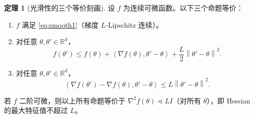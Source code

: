\documentclass[12pt,a4paper]{ctexart}
\theoremstyle{definition}
\newtheorem{theorem}{定理}[section]
\theoremstyle{plain}
\newcommand{\R}{\mathbb{R}}
\newcommand{\grad}{\nabla}
\newcommand{\norm}[1]{\left\lVert #1 \right\rVert}
\newcommand{\ip}[2]{\left\langle #1,#2 \right\rangle}
\begin{document}
\begin{theorem}[光滑性的三个等价刻画]\label{thm:smooth-equiv}
  设 $f$ 为连续可微函数。以下三个命题等价：
  \begin{enumerate}[label=(\roman*)]
    \item $f$ 满足 \eqref{eq:smooth1}（梯度 $L$-Lipschitz 连续）。
    \item 对任意 $\theta, \theta' \in \R^d$，
      \begin{equation}\label{eq:smooth2}
        f(\theta') \le f(\theta) + \ip{\grad f(\theta)}{\theta' - \theta} + \frac{L}{2}\norm{\theta' - \theta}^2.
      \end{equation}
    \item 对任意 $\theta, \theta' \in \R^d$，
      \begin{equation}\label{eq:smooth3}
        \ip{\grad f(\theta') - \grad f(\theta)}{\theta' - \theta} \le L \norm{\theta' - \theta}^2.
      \end{equation}
  \end{enumerate}
  若 $f$ 二阶可微，则以上所有命题等价于 $\grad^2 f(\theta) \preceq L I$（对所有 $\theta$），即 Hessian 的最大特征值不超过 $L$。
\end{theorem}
\end{document}
